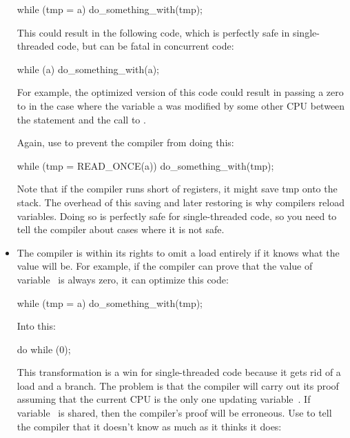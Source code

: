 \begin{itemize}
\begin{VerbatimU}
	while (tmp = a)
		do_something_with(tmp);
\end{VerbatimU}

     This could result in the following code, which is perfectly safe in
     single-threaded code, but can be fatal in concurrent code:

\begin{VerbatimU}
	while (a)
		do_something_with(a);
\end{VerbatimU}

     For example, the optimized version of this code could result in
     passing a zero to  in the case where the variable
     a was modified by some other CPU between the  statement and
     the call to .

     Again, use  to prevent the compiler from doing this:

\begin{VerbatimU}
	while (tmp = READ_ONCE(a))
		do_something_with(tmp);
\end{VerbatimU}

     Note that if the compiler runs short of registers, it might save
     tmp onto the stack.
     The overhead of this saving and later restoring is why compilers
     reload variables.
     Doing so is perfectly safe for single-threaded code, so you need
     to tell the compiler about cases where it is not safe.

 \item
     The compiler is within its rights to omit a load entirely if it knows
     what the value will be.
     For example, if the compiler can prove that the value of variable~
     is always zero, it can optimize this code:

\begin{VerbatimU}
	while (tmp = a)
		do_something_with(tmp);
\end{VerbatimU}

     Into this:

\begin{VerbatimU}
	do { } while (0);
\end{VerbatimU}

     This transformation is a win for single-threaded code because it
     gets rid of a load and a branch.
     The problem is that the compiler will carry out its proof assuming
     that the current CPU is the only one updating variable~.
     If variable~ is shared, then the compiler's proof will be erroneous.
     Use  to tell the compiler that it doesn't know as
     much as it thinks it does:


\end{itemize}
